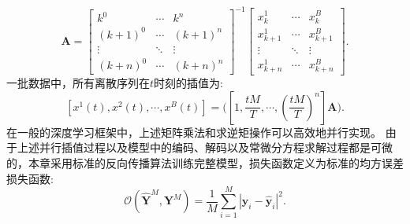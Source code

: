 \begin{equation}
\boldsymbol{A}=\left[\begin{array}{ccc}
k^{0} & \cdots & k^{n} \\
(k+1)^0 & \cdots & (k+1)^{n} \\
\vdots & \ddots & \vdots \\
(k+n)^0 & \cdots & (k+n)^{n}
\end{array}\right]^{-1}\left[\begin{array}{ccc}
x_{k}^{1} & \cdots & x_{k}^{B} \\
x_{k+1}^{1} & \cdots & x_{k+1}^{B} \\
\vdots & \ddots & \vdots \\
x_{k+n}^{1} & \cdots & x_{k+n}^{B}
\end{array}\right].
\end{equation}
一批数据中，所有离散序列在$t$时刻的插值为:
\begin{equation}
\left[ x^1(t), x^2(t),\cdots, x^B(t)\right]= \Bigg(\left[ 1, \frac{tM}{T},\cdots, (\frac{tM}{T})^n\right]\boldsymbol{A}\Bigg). 
\end{equation}
在一般的深度学习框架中，上述矩阵乘法和求逆矩操作可以高效地并行实现。
由于上述并行插值过程以及模型中的编码、解码以及常微分方程求解过程都是可微的，本章采用标准的反向传播算法训练完整模型，损失函数定义为标准的均方误差损失函数:
\begin{equation}
\label{equ:mse_loss}
\mathcal{O}\left(\hat{\boldsymbol Y}^M, \boldsymbol{Y}^M\right)=\frac{1}{M} \sum_{i=1}^{M}\left|\boldsymbol y_{i}-\hat{\boldsymbol y}_{i}\right|^2.
\end{equation}

